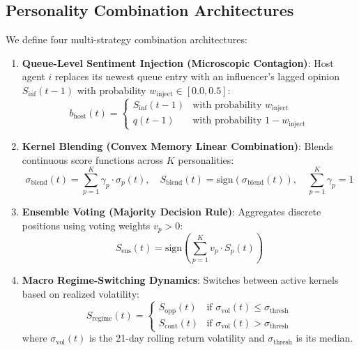 \subsection{Personality Combination Architectures}
We define four multi-strategy combination architectures:
\begin{enumerate}
    \item \textbf{Queue-Level Sentiment Injection (Microscopic Contagion)}: Host agent $i$ replaces its newest queue entry with an influencer's lagged opinion $S_{\text{inf}}(t-1)$ with probability $w_{\text{inject}} \in [0.0, 0.5]$:
    \begin{equation}
        b_{\text{host}}(t) = 
        \begin{cases}
            S_{\text{inf}}(t-1) & \text{with probability } w_{\text{inject}} \\
            q(t-1) & \text{with probability } 1 - w_{\text{inject}}
        \end{cases}
    \end{equation}
    \item \textbf{Kernel Blending (Convex Memory Linear Combination)}: Blends continuous score functions across $K$ personalities:
    \begin{equation}
        \sigma_{\text{blend}}(t) = \sum_{p=1}^K \gamma_p \cdot \sigma_p(t), \quad S_{\text{blend}}(t) = \text{sign}\left( \sigma_{\text{blend}}(t) \right), \quad \sum_{p=1}^K \gamma_p = 1
    \end{equation}
    \item \textbf{Ensemble Voting (Majority Decision Rule)}: Aggregates discrete positions using voting weights $v_p > 0$:
    \begin{equation}
        S_{\text{ens}}(t) = \text{sign}\left( \sum_{p=1}^K v_p \cdot S_p(t) \right)
    \end{equation}
    \item \textbf{Macro Regime-Switching Dynamics}: Switches between active kernels based on realized volatility:
    \begin{equation}
        S_{\text{regime}}(t) = 
        \begin{cases}
            S_{\text{opp}}(t) & \text{if } \sigma_{\text{vol}}(t) \le \sigma_{\text{thresh}} \\
            S_{\text{cont}}(t) & \text{if } \sigma_{\text{vol}}(t) > \sigma_{\text{thresh}}
        \end{cases}
    \end{equation}
    where $\sigma_{\text{vol}}(t)$ is the 21-day rolling return volatility and $\sigma_{\text{thresh}}$ is its median.
\end{enumerate}

